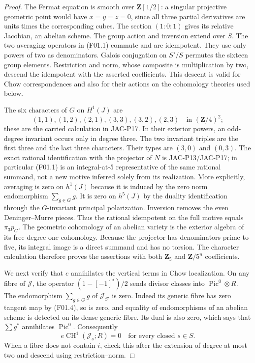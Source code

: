 \documentclass[11pt]{article}
\theoremstyle{remark}\newtheorem{remark}[theorem]{Remark}
\begin{document}
\begin{proof}
The Fermat equation is smooth over $\mathbf Z[1/2]$: a singular
projective geometric point would have $x=y=z=0$, since all three
partial derivatives are units times the corresponding cubes.
The section $(1:0:1)$ gives its relative Jacobian, an abelian scheme.
The group action and inversion extend over $S$.  The two averaging
operators in (F01.1) commute and are idempotent.  They use only
powers of two as denominators.  Galois conjugation on $S'/S$ permutes
the sixteen group elements.  Restriction and norm, whose composite
is multiplication by two, descend the idempotent with the asserted
coefficients.  This descent is valid for Chow correspondences and
also for their actions on the cohomology theories used below.

The six characters of $G$ on $H^1(J)$ are
\[
 (1,1),(1,2),(2,1),(3,3),(3,2),(2,3)\quad\text{in }(\mathbf Z/4)^2;
 \tag{F01.4}
\]
these are the carried calculation in JAC-P17.  In their exterior
powers, an odd-degree invariant occurs only in degree three.  The
two invariant triples are the first three and the last three
characters.  Their types are $(3,0)$ and $(0,3)$.  The exact rational
identification with the projector of $N$ is JAC-P13/JAC-P17; in
particular (F01.1) is an integral-at-5 representative of the same
rational summand, not a new motive inferred solely from its
realization.  More explicitly, averaging is zero on $h^1(J)$
because it is induced by the zero norm endomorphism
$\sum_{g\in G}g$.  It is zero on $h^5(J)$ by the duality
identification through the $G$-invariant principal polarization.
Inversion removes the even Deninger--Murre pieces.  Thus the
rational idempotent on the full motive equals $\pi_3p_G$.
The geometric cohomology of an abelian variety is the
exterior algebra of its free degree-one cohomology.  Because the
projector has denominators prime to five, its integral image is a
direct summand and has no torsion.  The character calculation
therefore proves the assertions with both $\mathbf Z_5$ and
$\mathbf Z/5^n$ coefficients.

We next verify that $e$ annihilates the vertical terms in Chow
localization.  On any fibre of $\mathcal J$, the operator
$(1-[-1]^*)/2$ sends divisor classes into
$\operatorname{Pic}^0\otimes R$.  The endomorphism
$\sum_{g\in G}g$ of $\mathcal J_{S'}$ is zero.  Indeed its generic
fibre has zero tangent map by (F01.4), so is zero, and equality of
endomorphisms of an abelian scheme is detected on its dense generic
fibre.  Its dual is also zero, which says that
$\sum g^*$ annihilates $\operatorname{Pic}^0$.  Consequently
\[
 e\operatorname{CH}^1(\mathcal J_s;R)=0
 \quad\text{for every closed }s\in S.            \tag{F01.5}
\]
When a fibre does not contain $i$, check this after the extension
of degree at most two and descend using restriction--norm.


\end{proof}
\end{document}
